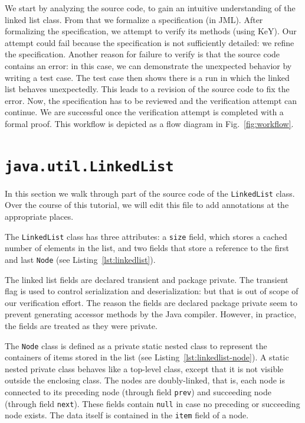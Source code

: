 \documentclass[runningheads]{llncs}
\begin{document}
We start by analyzing the source code, to gain an intuitive understanding of the linked list class. From that we formalize a specification (in JML). After formalizing the specification, we attempt to verify its methods (using KeY). Our attempt could fail because the specification is not sufficiently detailed: we refine the specification. Another reason for failure to verify is that the source code contains an error: in this case, we can demonstrate the unexpected behavior by writing a test case. The test case then shows there is a run in which the linked list behaves unexpectedly. This leads to a revision of the source code to fix the error. Now, the specification has to be reviewed and the verification attempt can continue. We are successful once the verification attempt is completed with a formal proof. This workflow is depicted as a flow diagram in Fig.~\ref{fig:workflow}.

\section{\texttt{java.util.LinkedList}}\label{sec:linkedlist}

In this section we walk through part of the source code of the \texttt{LinkedList} class. Over the course of this tutorial, we will edit this file to add annotations at the appropriate places.



The \texttt{LinkedList} class has three attributes: a \texttt{size} field, which stores a cached number of elements in the list, and two
fields that store a reference to the first and last \texttt{Node} (see Listing~\ref{lst:linkedlist}).

The linked list fields are declared transient and package private. The transient flag is used to control serialization and deserialization: but that is out of scope of our verification effort. The reason the fields are declared package private seem to prevent generating accessor methods by the Java compiler. However, in practice, the fields are treated as they were private.

The \texttt{Node} class is defined as a private static nested class to represent the containers of items stored in the list (see Listing~\ref{lst:linkedlist-node}). A static nested private class behaves like a top-level class, except that it is not visible outside the enclosing class. The nodes are doubly-linked, that is, each node is connected to its preceding node (through field \texttt{prev}) and succeeding node (through field \texttt{next}). These fields contain \texttt{null} in case no preceding or succeeding node exists. The data itself is contained in the \texttt{item} field of a node.
\end{document}
